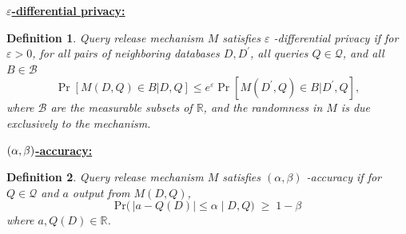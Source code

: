 \documentclass[landscape]{baposter}
\newtheorem{definition}{Definition}
\begin{document}
\begin{poster}
{\underline{\large \bf $\varepsilon$-differential privacy:}
\begin{definition} Query release mechanism $M$ satisfies $\varepsilon$%
-differential privacy if for $\varepsilon > 0$, for all pairs of neighboring databases $D,D^{\prime }$, all queries $Q\in\mathcal{Q}$, and all $B\in \mathcal{B}$
\begin{equation*}
\Pr \left[ M(D,Q)\in B |D,Q\right] \leq e^{\varepsilon }\Pr \left[
M(D^{\prime },Q)\in B |D^{\prime},Q\right],
\end{equation*}%
where $\mathcal{B}$ are the measurable subsets of $\mathbb{R}$, 
and the randomness in $M$ is due exclusively to the mechanism.
\end{definition}

\underline{\large \bf $(\alpha ,\protect\beta )$-accuracy:}
\begin{definition}
 Query release mechanism $M$ satisfies $(\alpha ,\beta )$%
-accuracy if for $Q\in\mathcal{Q}$ and $a$ output from $M(D,Q)$,
$$\mbox{Pr}\Big( \, |a-Q(D)| \le \alpha \; \Big| \; D,Q\Big) \; \ge \; 1-\beta $$
where $a, Q(D) \in \mathbb{R}$.
\end{definition}


}
%


\end{poster}
\end{document}
